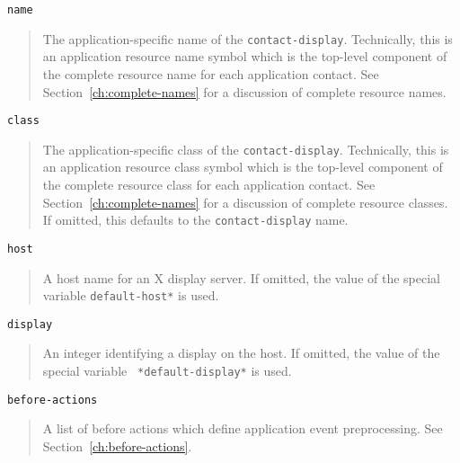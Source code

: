 \begin{flushright} \parbox[t]{6.125in}{
{\tt name}
\begin{quote}
The application-specific name of the {\tt contact-display}. Technically,
this is an
application resource name symbol which is the top-level component of the
complete resource name for each application contact.  See
Section~\ref{ch:complete-names} for a discussion of complete resource names.
\end{quote}

}\end{flushright}

\begin{flushright} \parbox[t]{6.125in}{
{\tt class}
\begin{quote}
The application-specific class of the {\tt contact-display}. Technically,
this is an
application resource class symbol which is the top-level component of the
complete resource class for each application contact.  See
Section~\ref{ch:complete-names} for a discussion of complete resource
classes.
If omitted, this  defaults to the {\tt contact-display} name.
\end{quote}

}\end{flushright}

\begin{flushright} \parbox[t]{6.125in}{
{\tt host}
\begin{quote}
A host name for an X display server\footnotemark. If omitted, the value of the
special variable {\tt *default-host*}
is used. 
\end{quote}

}\end{flushright}

\begin{flushright} \parbox[t]{6.125in}{
{\tt display}
\begin{quote}
An integer identifying a display on the host. 
If omitted, the value of the
special variable {\tt
*default-display*} is used.
\end{quote}

}\end{flushright}


\begin{flushright} \parbox[t]{6.125in}{
{\tt before-actions}
\begin{quote}
A list of before actions which define application event
preprocessing. 
See Section~\ref{ch:before-actions}.  
\end{quote}

}\end{flushright}



